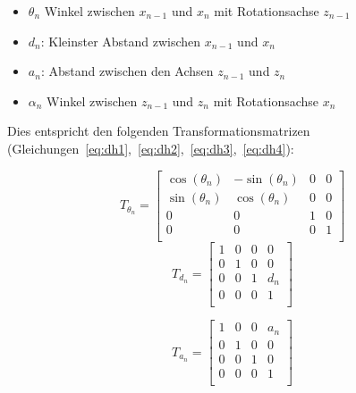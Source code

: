 \begin{itemize}
    \item $\theta_n$ Winkel zwischen $x_{n-1}$ und $x_n$ mit Rotationsachse $z_{n-1}$
    \item $d_n$: Kleinster Abstand zwischen $x_{n-1}$ und $x_n$
    \item $a_n$: Abstand zwischen den Achsen $z_{n-1}$ und $z_n$
    \item $\alpha_n$ Winkel zwischen $z_{n-1}$ und $z_n$ mit Rotationsachse $x_{n}$
\end{itemize}

Dies entspricht den folgenden Transformationsmatrizen (Gleichungen~\ref{eq:dh1},~\ref{eq:dh2},~\ref{eq:dh3},~\ref{eq:dh4}):

\newcommand{\ct}{\cos(\theta_n)}
\newcommand{\st}{\sin(\theta_n)}
\newcommand{\ca}{\cos(\alpha_n)}
\newcommand{\sa}{\sin(\alpha_n)}

\begin{equation}
    T_{\theta_n} =
    \begin{bmatrix}
        \ct & -\st & 0 & 0 \\
        \st & \ct  & 0 & 0 \\
        0   & 0    & 1 & 0 \\
        0   & 0    & 0 & 1 \\
    \end{bmatrix}
    \label{eq:dh1}
\end{equation}
\begin{equation}
    T_{d_n} =
    \begin{bmatrix}
        1 & 0 & 0 & 0   \\
        0 & 1 & 0 & 0   \\
        0 & 0 & 1 & d_n \\
        0 & 0 & 0 & 1   \\
    \end{bmatrix}
    \label{eq:dh2}
\end{equation}

\begin{equation}
    T_{a_n} =
    \begin{bmatrix}
        1 & 0 & 0 & a_n \\
        0 & 1 & 0 & 0   \\
        0 & 0 & 1 & 0   \\
        0 & 0 & 0 & 1   \\
    \end{bmatrix}
    \label{eq:dh3}
\end{equation}

